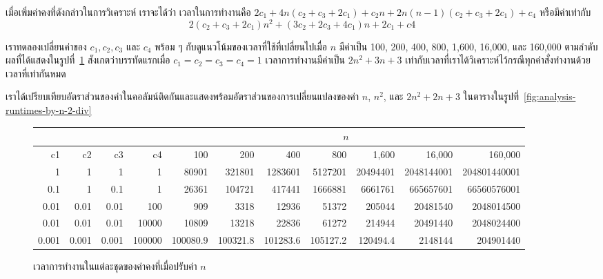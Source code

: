 เมื่อ{\wbr}เพิ่ม{\wbr}ค่าคงที่{\wbr}ดังกล่าว{\wbr}ใน{\wbr}การ{\wbr}วิเคราะห์ เรา{\wbr}จะ{\wbr}ได้{\wbr}ว่า เวลา{\wbr}ใน{\wbr}การ{\wbr}ทำงาน{\wbr}คือ{\wbr}
$2 c_1 + 4n(c_2 +c_3 + 2c_1) + c_2n + 2n(n-1)(c_2 +c_3 + 2c_1) + c_4$ หรือ{\wbr}มี{\wbr}ค่า{\wbr}เท่า{\wbr}กับ{\wbr}
\[
2(c_2+c_3+2c_1)n^2 + (3c_2 + 2c_3 + 4c_1)n + 2c_1 + c4
\]

เรา{\wbr}ทดลอง{\wbr}เปลี่ยน{\wbr}ค่า{\wbr}ของ $c_1,c_2,c_3$ และ $c_4$ พร้อม ๆ
กับ{\wbr}ดู{\wbr}แนวโน้ม{\wbr}ของ{\wbr}เวลา{\wbr}ที่{\wbr}ใช้{\wbr}ที่{\wbr}เปลี่ยน{\wbr}ไป{\wbr}เมื่อ $n$ มี{\wbr}ค่า{\wbr}เป็น 100, 200, 400, 800, 1,600,
16,000, และ 160,000 ตาม{\wbr}ลำดับ{\wbr}
ผล{\wbr}ที่{\wbr}ได้{\wbr}แสดง{\wbr}ใน{\wbr}รูป{\wbr}ที่~\ref{fig:analysis-runtimes-by-n-2} สังเกต{\wbr}ว่า{\wbr}บรรทัด{\wbr}แรก{\wbr}เมื่อ{\wbr}
$c_1=c_2=c_3=c_4=1$ เวลา{\wbr}การ{\wbr}ทำงาน{\wbr}มี{\wbr}ค่า{\wbr}เป็น $2n^2+3n+3$
เท่า{\wbr}กับ{\wbr}เวลา{\wbr}ที่{\wbr}เรา{\wbr}ได้{\wbr}วิเคราะห์{\wbr}ไว้{\wbr}กรณี{\wbr}ทุก{\wbr}คำสั่ง{\wbr}ทำงาน{\wbr}ด้วย{\wbr}เวลา{\wbr}ที่{\wbr}เท่า{\wbr}กัน{\wbr}หมด{\wbr}

เรา{\wbr}ได้{\wbr}เปรียบเทียบ{\wbr}อัตราส่วน{\wbr}ของ{\wbr}ค่า{\wbr}ใน{\wbr}คอลัมน์{\wbr}ติด{\wbr}กัน{\wbr}และ{\wbr}แสดง{\wbr}พร้อม{\wbr}อัตราส่วน{\wbr}ของ{\wbr}การ{\wbr}เปลี่ยนแปลง{\wbr}ของ{\wbr}ค่า{\wbr}
$n$, $n^2$, และ $2n^2+2n+3$
ใน{\wbr}ตาราง{\wbr}ใน{\wbr}รูป{\wbr}ที่~\ref{fig:analysis-runtimes-by-n-2-div}

\begin{figure}
{\footnotesize
\begin{center}
\begin{tabular}{|r|r|r|r|r|r|r|r|r|r|r|}
\hline
\multicolumn{4}{|c|}{} & \multicolumn{7}{c|}{$n$}\\
\hline
c1 & c2 & c3 & c4 & 100 & 200 & 400 & 800 & 1,600 & 16,000 & 160,000\\
\hline
1 & 1 & 1 & 1 & 80901 & 321801 & 1283601 & 5127201 & 20494401 & 2048144001 & 204801440001\\
0.1 & 1 & 0.1 & 1 & 26361 & 104721 & 417441 & 1666881 & 6661761 & 665657601 & 66560576001\\
0.01 & 0.01 & 0.01 & 100 & 909 & 3318 & 12936 & 51372 & 205044 & 20481540 & 2048014500\\
0.01 & 0.01 & 0.01 & 10000 & 10809 & 13218 & 22836 & 61272 & 214944 & 20491440 & 2048024400\\
0.001 & 0.001 & 0.001 & 100000 & 100080.9 & 100321.8 & 101283.6 & 105127.2 & 120494.4 & 2148144 & 204901440\\
\hline
\end{tabular}
\end{center}
}
\caption{เวลา{\wbr}การ{\wbr}ทำงาน{\wbr}ใน{\wbr}แต่ละ{\wbr}ชุด{\wbr}ของ{\wbr}ค่าคงที่{\wbr}เมื่อ{\wbr}ปรับ{\wbr}ค่า $n$}
\label{fig:analysis-runtimes-by-n-2}
\end{figure}

